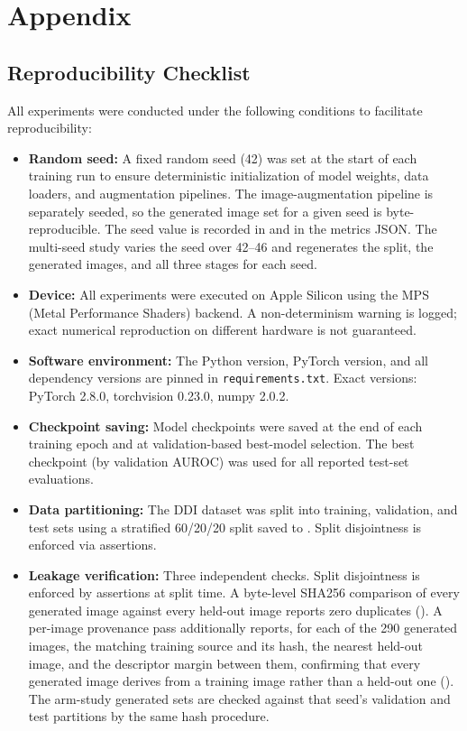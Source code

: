 \section{Appendix}

\subsection{Reproducibility Checklist}

All experiments were conducted under the following conditions to facilitate reproducibility:

\begin{itemize}
    \item \textbf{Random seed:} A fixed random seed (42) was set at the start of each training run to ensure deterministic initialization of model weights, data loaders, and augmentation pipelines. The image-augmentation pipeline is separately seeded, so the generated image set for a given seed is byte-reproducible. The seed value is recorded in  and in the metrics JSON. The multi-seed study varies the seed over 42--46 and regenerates the split, the generated images, and all three stages for each seed.
    \item \textbf{Device:} All experiments were executed on Apple Silicon using the MPS (Metal Performance Shaders) backend. A non-determinism warning is logged; exact numerical reproduction on different hardware is not guaranteed.
    \item \textbf{Software environment:} The Python version, PyTorch version, and all dependency versions are pinned in \texttt{requirements.txt}. Exact versions: PyTorch 2.8.0, torchvision 0.23.0, numpy 2.0.2.
    \item \textbf{Checkpoint saving:} Model checkpoints were saved at the end of each training epoch and at validation-based best-model selection. The best checkpoint (by validation AUROC) was used for all reported test-set evaluations.
    \item \textbf{Data partitioning:} The DDI dataset was split into training, validation, and test sets using a stratified 60/20/20 split saved to . Split disjointness is enforced via assertions.
    \item \textbf{Leakage verification:} Three independent checks. Split disjointness is enforced by assertions at split time. A byte-level SHA256 comparison of every generated image against every held-out image reports zero duplicates (). A per-image provenance pass additionally reports, for each of the 290 generated images, the matching training source and its hash, the nearest held-out image, and the descriptor margin between them, confirming that every generated image derives from a training image rather than a held-out one (). The arm-study generated sets are checked against that seed's validation and test partitions by the same hash procedure.

\end{itemize}
